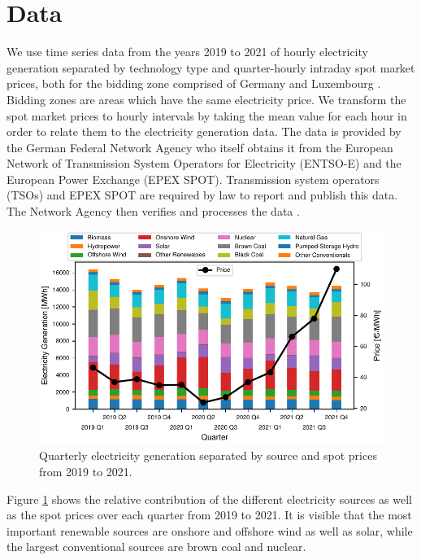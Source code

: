 \documentclass{article}
\begin{document}
\section{Data}
We use time series data from the years 2019 to 2021 of hourly electricity generation separated by technology type and quarter-hourly intraday spot market prices, both for the bidding zone comprised of Germany and Luxembourg \citep{smard}.
Bidding zones are areas which have the same electricity price.
We transform the spot market prices to hourly intervals by taking the mean value for each hour in order to relate them to the electricity generation data.
The data is provided by the German Federal Network Agency who itself obtains it from the European Network of Transmission System Operators for Electricity (ENTSO-E) and the European Power Exchange (EPEX SPOT).
Transmission system operators (TSOs) and EPEX SPOT are required by law to report and publish this data.
The Network Agency then verifies and processes the data \citep{smard_usermanual}.
\begin{figure}[h]
    \centering
    \includegraphics[width=\columnwidth]{doc/fig/quarterly_technology_mix_with_price.pdf}
    \caption{Quarterly electricity generation separated by source and spot prices from 2019 to 2021.}
    \label{fig:quarterly_mix}
\end{figure}
Figure \ref{fig:quarterly_mix} shows the relative contribution of the different electricity sources as well as the spot prices over each quarter from 2019 to 2021.
It is visible that the most important renewable sources are onshore and offshore wind as well as solar, while the largest conventional sources are brown coal and nuclear.
\end{document}
